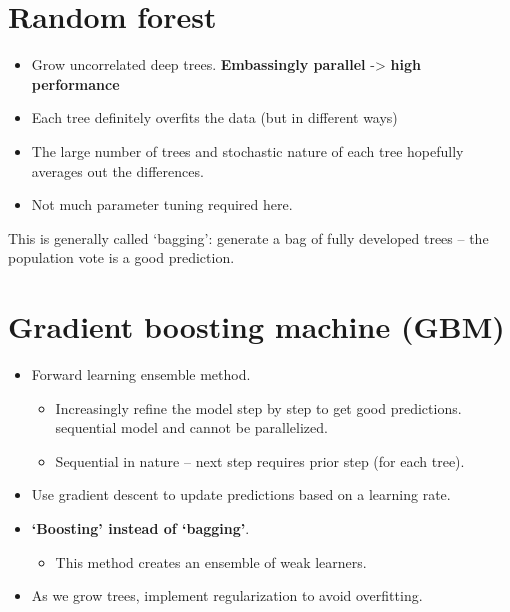 \documentclass[fontset=fandol,zihao=false,scheme=chinese,heading=true,UTF8]{ctexbook}
\providecommand{\tightlist}{%
  \setlength{\itemsep}{0pt}\setlength{\parskip}{0pt}}
\begin{document}
\hypertarget{random-forest}{%
\section{Random forest}\label{random-forest}}

\begin{itemize}
\tightlist
\item
  Grow uncorrelated deep trees. \textbf{Embassingly parallel} -\textgreater{} \textbf{high performance}
\item
  Each tree definitely overfits the data (but in different ways)
\item
  The large number of trees and stochastic nature of each tree hopefully averages out the differences.
\item
  Not much parameter tuning required here.
\end{itemize}

This is generally called `bagging': generate a bag of fully developed trees -- the population vote is a good prediction.

\hypertarget{gradient-boosting-machine-gbm}{%
\section{Gradient boosting machine (GBM)}\label{gradient-boosting-machine-gbm}}

\begin{itemize}
\tightlist
\item
  Forward learning ensemble method.

  \begin{itemize}
  \tightlist
  \item
    Increasingly refine the model step by step to get good predictions.  sequential model and cannot be parallelized.
  \item
    Sequential in nature -- next step requires prior step (for each tree).
  \end{itemize}
\item
  Use gradient descent to update predictions based on a learning rate.
\item
  \textbf{`Boosting' instead of `bagging'}.

  \begin{itemize}
  \tightlist
  \item
    This method creates an ensemble of weak learners.
  \end{itemize}
\item
  As we grow trees, implement regularization to avoid overfitting.
\end{itemize}
\end{document}
